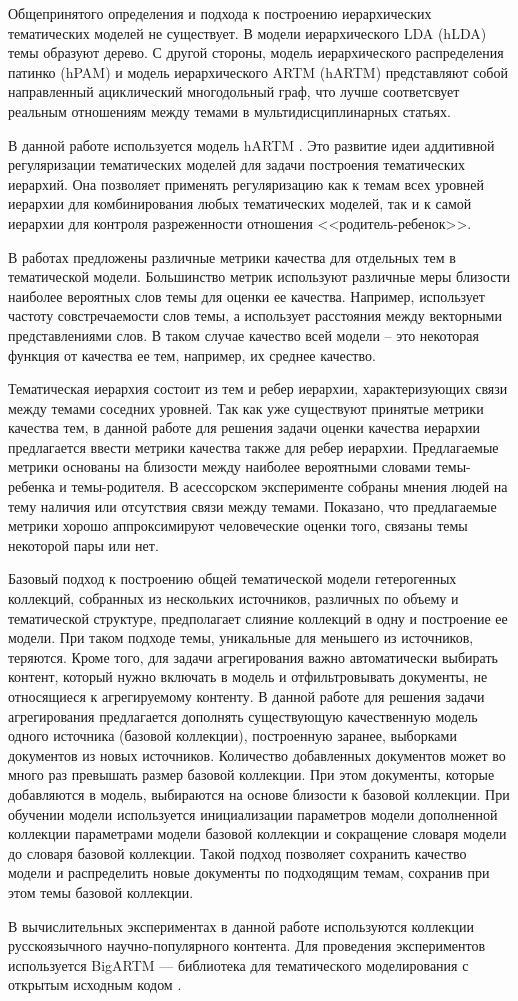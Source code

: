 Общепринятого определения и подхода к построению иерархических тематических моделей не существует. В модели иерархического LDA (hLDA) \cite{hLDA} темы образуют дерево. С другой стороны, модель иерархического распределения патинко (hPAM) \cite{hPAM} и модель иерархического ARTM (hARTM) \cite{hARTM} представляют собой направленный ациклический многодольный граф, что лучше соответсвует реальным отношениям между темами в мультидисциплинарных статьях.

В данной работе используется модель hARTM \cite{hARTM}. Это развитие идеи аддитивной регуляризации тематических моделей для задачи построения тематических иерархий.
Она позволяет применять регуляризацию как к темам всех уровней иерархии для комбинирования любых тематических моделей, так и к самой иерархии для контроля разреженности отношения <<родитель-ребенок>>.

В работах \cite{Mimno2011, Nikolenko2016, Nikolenko2017, Lau2014, Newman2010, Bouma2009} предложены различные метрики качества для отдельных тем в тематической модели. Большинство метрик используют различные меры близости наиболее вероятных слов темы для оценки ее качества. Например, \cite{Mimno2011} использует частоту совстречаемости слов темы, а \cite{Nikolenko2016} использует расстояния между векторными представлениями слов. В таком случае качество всей модели -- это некоторая функция от качества ее тем, например, их среднее качество.

Тематическая иерархия состоит из тем и ребер иерархии, характеризующих связи между темами соседних уровней. Так как уже существуют принятые метрики качества тем, в данной работе для решения задачи оценки качества иерархии предлагается ввести метрики качества также для ребер иерархии. Предлагаемые метрики основаны на близости между наиболее вероятными словами темы-ребенка и темы-родителя. В асессорском эксперименте собраны мнения людей на тему наличия или отсутствия связи между темами. Показано, что предлагаемые метрики хорошо аппроксимируют человеческие оценки того, связаны темы некоторой пары или нет.

Базовый подход к построению общей тематической модели гетерогенных коллекций, собранных из нескольких источников, различных по объему и тематической структуре, предполагает слияние коллекций в одну и построение ее модели. При таком подходе темы, уникальные для меньшего из источников, теряются. Кроме того, для задачи агрегирования важно автоматически выбирать контент, который нужно включать в модель и отфильтровывать документы, не относящиеся к агрегируемому контенту. В данной работе для решения задачи агрегирования предлагается дополнять существующую качественную модель одного источника (базовой коллекции), построенную заранее, выборками документов из новых источников. Количество добавленных документов может во много раз превышать размер базовой коллекции. При этом документы, которые добавляются в модель, выбираются на основе близости к базовой коллекции. При обучении модели используется инициализации параметров модели дополненной коллекции параметрами модели базовой коллекции и сокращение словаря модели до словаря базовой коллекции. 
Такой подход позволяет сохранить качество модели и распределить новые документы по подходящим темам, сохранив при этом темы базовой коллекции. 


В вычислительных экспериментах в данной работе используются коллекции русскоязычного научно-популярного контента. Для проведения экспериментов используется BigARTM --- библиотека для тематического моделирования с открытым исходным кодом \cite{Vorontsov2015a, Frei2017}.